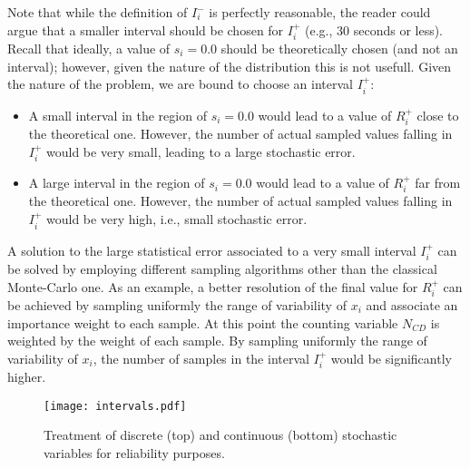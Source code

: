 Note that while the definition of $I_i^-$ is perfectly reasonable, the reader could argue that a smaller interval 
should be chosen for $I_i^+$ (e.g., 30 seconds or less). 
Recall that ideally, a value of $s_i=0.0$ should be theoretically chosen (and not an interval); however, 
given the nature of the distribution this is not usefull. Given the nature of the problem, we are bound 
to choose an interval $I_i^+$:
\begin{itemize}
  \item A small interval in the region of $s_i=0.0$ would lead to a value of $R_i^+$ close to the theoretical 
        one. 
        However, the number of actual sampled values falling in $I_i^+$ would be very small, leading to a large stochastic 
        error.
  \item A large interval in the region of $s_i=0.0$ would lead to a value of $R_i^+$ far from the theoretical one. 
        However, the number of actual sampled values falling in $I_i^+$ would be very high,
        i.e., small stochastic error.
\end{itemize}

A solution to the large statistical error associated to a very small interval $I_i^+$ can be solved by 
employing different sampling algorithms other than the classical Monte-Carlo one. 
As an example, a better resolution of the final value for $R_i^+$ can be achieved by sampling uniformly 
the range of variability of $x_i$ and associate an importance weight to each sample. At this point
the counting variable $N_{CD}$ is weighted by the weight of each sample. By sampling uniformly the range of 
variability of $x_i$, the number of samples in the interval $I_i^+$ would be significantly higher.

\begin{figure}
    \centering
    \centerline{\texttt{[image: intervals.pdf]}} 
    \caption{Treatment of discrete (top) and continuous (bottom) stochastic variables for reliability purposes.}
    \label{fig:intervals}
\end{figure}
